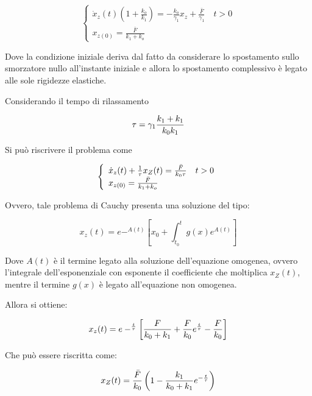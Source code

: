 \begin{equation}
	\left\{\begin{array}{l}
		\dot{x}_{z}(t)\left(1+\frac{k_{o}}{k_{1}}\right)=-\frac{k_{o}}{\gamma_{1}} x_{z}+\frac{\bar{F}}{\gamma_{1}} \quad t>0 \\
		x_{z(0)}=\frac{\bar{F}}{k_{1}+k_{o}}
	\end{array}\right.
\end{equation}

Dove la condizione iniziale deriva dal fatto da considerare lo spostamento sullo smorzatore nullo all'instante iniziale e allora lo spostamento complessivo è legato alle sole rigidezze elastiche.

Considerando il tempo di rilassamento

\begin{equation}
\tau={\gamma_1}{k_1+k_1\over k_0k_1}
\end{equation} 


 
Si può riscrivere il problema come

\begin{equation}
		\left\{\begin{array}{l}
		\dot{x}_{z}(t) +{1\over \tau}x_Z(t)={\bar F\over k_0\tau} \quad t>0 \\
		x_{z(0)}=\frac{\bar{F}}{k_{1}+k_{o}}
	\end{array}\right.
\end{equation} 

Ovvero, tale problema di Cauchy presenta una soluzione del tipo:

\begin{equation}
x_z(t)=e-^{A(t)}\left[x_0+\int_{t_0}^{t} g(x) e^{A(t)}\right]
\end{equation}

Dove $A(t)$ è il termine legato alla soluzione dell'equazione omogenea, ovvero l'integrale dell'esponenziale con esponente il coefficiente che moltiplica $x_Z(t)$, mentre il termine $g(x)$ è legato all'equazione non omogenea.

Allora si ottiene:

\begin{equation}
	x_z(t)=e-^{t\over \tau}\left[{F\over k_0+k_1}+{F\over k_0}e^{t\over \tau}-{F\over k_0}\right]
\end{equation}

Che può essere riscritta come:

\begin{equation}
	x_Z(t)={\bar F\over k_0}\left(1-{k_1\over k_0+k_1}e^{-{t\over \tau}}\right)
\end{equation}

